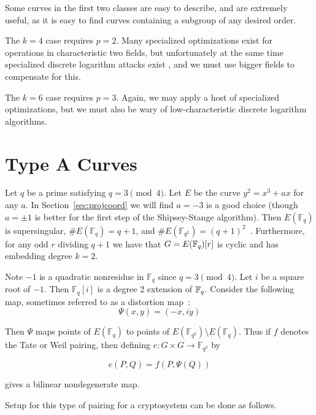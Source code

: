 Some curves in the first two classes are easy to describe, and are
extremely useful, as it is easy to find curves containing a
subgroup of any desired order.

The $k=4$ case requires $p=2$.
Many specialized optimizations exist for
operations in characteristic two fields,
but unfortunately at the same time specialized discrete logarithm attacks
exist \cite{coppersmith}, and we must use bigger fields to compensate for
this. 

The $k=6$ case requires $p=3$. Again, we may apply
a host of specialized optimizations, but we must also be wary of
low-characteristic discrete logarithm algorithms.

\section {Type A Curves}

Let $q$ be a prime satisfying $q = 3 \pmod{4}$.
Let $E$ be the curve $y^2 = x^3 + a x$ for any $a$.
In Section~\ref{sec:projcoord} we will find $a=-3$ is a good choice
(though $a=\pm1$ is better for the first step of the Shipsey-Stange algorithm).
Then
$E(\mathbb{F}_q)$ is supersingular,
$\#E(\mathbb{F}_q) = q+1$, and
$\#E(\mathbb{F}_{q^2}) = (q+1)^2$~\cite[\S 3.2]{fst}.
Furthermore, for any odd $r$ dividing $q + 1$ we have that
$G = E(\mathbb{F}_q)[r]$ is cyclic and has embedding degree $k = 2$.

Note $-1$ is a quadratic nonresidue in $\mathbb{F}_q$ since $q = 3\pmod{4}$.
Let $i$ be a square root of $-1$. Then $\mathbb{F}_q[i]$ is a degree 2
extension of $\mathbb{F}_q$.
Consider the following map, sometimes referred to as a distortion
map~\cite{verheul}:
\[ \Psi(x, y) = (-x, i y) \]

Then $\Psi$ maps points of $E(\mathbb{F}_q)$ to points of
$E(\mathbb{F}_{q^2}) \setminus E(\mathbb{F}_q)$. Thus if $f$ denotes the
Tate or Weil pairing, then defining $e:G \times G \rightarrow \mathbb{F}_{q^2}$
by

\[ e(P,Q) = f(P, \Psi(Q)) \]

gives a bilinear nondegenerate map.

Setup for this type of pairing for a cryptosystem can be done as follows.

